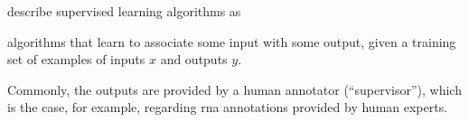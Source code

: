 


\textcite{goodfellow2016deep} describe supervised learning
algorithms as

\begin{italicquotes}
    algorithms that learn to associate some input with some
    output, given a training set of examples of inputs $x$
    and outputs $y$.
\end{italicquotes}

Commonly, the outputs are provided by a human annotator
(``supervisor''), which is the case, for example, regarding
\gls{rna} annotations provided by human experts.
